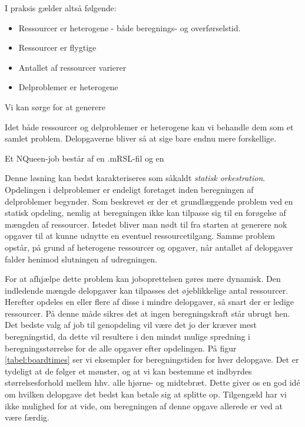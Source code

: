 \documentclass[draft,a4paper,10pt]{article}
\begin{document}
I praksis gælder altså følgende:
\begin{itemize}
	\item Ressourcer er heterogene - både beregnings- og overførselstid. 
	\item Ressourcer er flygtige
	\item Antallet af ressourcer varierer
	\item Delproblemer er heterogene
	\
\end{itemize}
 
Vi kan sørge for at generere 





Idet både ressourcer og delproblemer er heterogene kan vi behandle dem som et samlet problem. Delopgaverne bliver så at sige bare endnu mere forskellige.


Et NQueen-job består af en .mRSL-fil og en  


Denne løsning kan bedst karakteriseres som såkaldt \emph{statisk orkestration}. Opdelingen i delproblemer er endeligt foretaget inden beregningen af delproblemer begynder. Som beskrevet er der et grundlæggende problem ved en statisk opdeling, nemlig at beregningen ikke kan tilpasse sig til en forøgelse af mængden af ressourcer. Istedet bliver man nødt til fra starten at generere nok opgaver til at kunne udnytte en eventuel ressourcetilgang. Samme problem opstår, på grund af heterogene ressourcer og opgaver, når antallet af delopgaver falder henimod slutningen af udregningen. 

For at afhjælpe dette problem kan joboprettelsen gøres mere dynamisk. Den indledende mængde delopgaver kan tilpasses det øjeblikkelige antal ressourcer. Herefter opdeles en eller flere af disse i mindre delopgaver, så snart der er ledige ressourcer. På denne måde sikres det at ingen beregningskraft står ubrugt hen. 
Det bedste valg af job til genopdeling vil være det jo der kræver mest beregningstid, da dette vil resultere i den mindst mulige spredning i beregningsstørrelse for de alle opgaver efter opdelingen. På figur \ref{tabel:boardtimes} ser vi eksempler for beregningstiden for hver delopgave. Det er tydeligt at de følger et mønster, og at vi kan bestemme et indbyrdes størrelsesforhold mellem hhv. alle hjørne- og midtebræt. Dette giver os en god idé om hvilken delopgave det bedst kan betale sig at splitte op. Tilgengæld har vi ikke mulighed for at vide, om beregningen af denne opgave allerede er ved at være færdig. 
\end{document}
